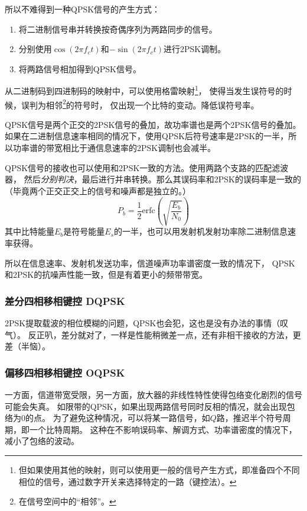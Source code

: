     所以不难得到一种QPSK信号的产生方式：
    \begin{enumerate}[itemsep=0pt,parsep=0em,label=\color{bupt}\arabic*、,labelsep=0pt,leftmargin=4em]
        \item 将二进制信号串并转换按奇偶序列为两路同步的信号。
        \item 分别使用$\cos(2\pi f_ct)$和$-\sin(2\pi f_ct)$进行2PSK调制。
        \item 将两路信号相加得到QPSK信号。
    \end{enumerate}

    从二进制码到四进制码的映射中，可以使用格雷映射\footnote{但如果使用其他的映射，则可以使用更一般的信号产生方式，即准备四个不同相位的信号，通过数字开关来选择特定的一路（键控法）。}，
    使得当发生误符号的时候，误判为相邻\footnote{在信号空间中的“相邻”。}的符号时，
    仅出现一个比特的变动。降低误符号率。

    QPSK信号是两个正交的2PSK信号的叠加，故功率谱也是两个2PSK信号的叠加。
    如果在二进制信息速率相同的情况下，使用QPSK后符号速率是2PSK的一半，所以功率谱的带宽相比于通信息速率的2PSK调制也会减半。
    
    QPSK信号的接收也可以使用和2PSK一致的方法。使用两路个支路的匹配滤波器，
    然后\emph{分别判决}，最后进行并串转换。那么其误码率和2PSK的误码率是一致的（毕竟两个正交正交上的信号和噪声都是独立的。）
    \begin{equation}
        P_b=\frac{1}{2}\text{erfc}\left(\sqrt{\frac{E_b}{N_0}}\right)
    \end{equation}
    其中比特能量$E_b$是符号能量$E_s$的一半，也可以用发射机发射功率除二进制信息速率获得。

    所以在信息速率、发射机发送功率，信道噪声功率谱密度一致的情况下，
    QPSK和2PSK的抗噪声性能一致，但是有着更小的频带带宽。

    \subsubsection{差分四相移相键控 DQPSK}
    2PSK提取载波的相位模糊的问题，QPSK也会犯，这也是没有办法的事情（叹气）。
    反正叭，差分就对了，一样是性能稍微差一点，还有非相干接收的方法，更差（半恼）。

    \subsubsection{偏移四相移相键控 OQPSK}
    一方面，信道带宽受限，另一方面，放大器的非线性特性使得包络变化剧烈的信号可能会失真。
    如限带的QPSK，如果出现两路信号同时反相的情况，就会出现包络为0的点。
    为了避免这种情况，可以将某一路信号，如$Q$路，推迟半个符号周期，即一个比特周期。
    这种在不影响误码率、解调方式、功率谱密度的情况下，减小了包络的波动。

